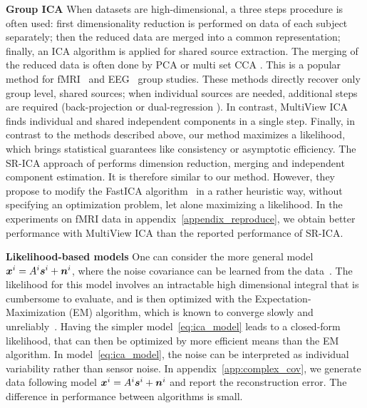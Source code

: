 \textbf{Group ICA} When datasets are high-dimensional, a three steps procedure is often used: first dimensionality reduction is performed on data of each subject  separately; then the reduced data are merged into a common representation; finally, an ICA algorithm is applied for shared source extraction. The merging of the reduced data is often done by PCA \cite{calhoun2001method} or multi set CCA \cite{varoquaux2009canica}.
This is a popular method for fMRI~\cite{calhoun2009review} and EEG~\cite{eichele2011eegift} group studies.
These methods directly recover only group level, shared sources; when individual sources are needed, additional steps are required (back-projection \cite{calhoun2001method} or dual-regression \cite{beckmann2009group}).
%
In contrast, MultiView ICA finds individual and shared independent components in a single step.
%
%
Finally, in contrast to the methods described above, our method maximizes a likelihood, which brings statistical guarantees like consistency or asymptotic efficiency.
%
The SR-ICA approach of \cite{zhang2016searchlight} performs dimension reduction, merging and independent component estimation. It is therefore similar to our method.
%
However, they propose to modify the FastICA algorithm~\cite{hyvarinen1999fast} in a rather heuristic way, without specifying an optimization problem, let alone maximizing a likelihood. In the experiments on fMRI data in appendix~\ref{appendix_reproduce}, we obtain better performance with MultiView ICA than the reported performance of SR-ICA.
%
%

\textbf{Likelihood-based models} One can consider the more general model $\boldsymbol{x}^i = A^i\boldsymbol{s}^i + \boldsymbol{n}^i$, where the noise covariance can be learned from the data~\cite{guo2008unified}.
%
The likelihood for this model involves an intractable high dimensional integral that is cumbersome to evaluate, and is then optimized with the Expectation-Maximization (EM) algorithm, which is known to converge slowly and unreliably~\cite{bermond1999approximate, petersen2005slow}.
%
Having the simpler model~\eqref{eq:ica_model} leads to a closed-form likelihood, that can then be optimized by more efficient means than the EM algorithm.
In model~\eqref{eq:ica_model}, the noise can be interpreted as individual variability rather than sensor noise. %
In appendix~\ref{app:complex_cov}, we generate data following model $\boldsymbol{x}^i = A^i\boldsymbol{s}^i + \boldsymbol{n}^i$ and report the reconstruction error. The difference in performance between algorithms is small. 
%
%
%

